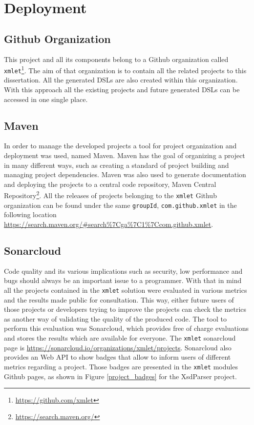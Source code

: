 \chapter{Deployment}
\label{cha:deployment}

\section{Github Organization} %
\label{sec:github}

This project and all its components belong to a Github organization called \texttt{xmlet}\footnote{\url{https://github.com/xmlet}}. The aim of that organization is to contain all the related projects to this dissertation. All the generated \ac{DSL}s are also created within this organization. With this approach all the existing projects and future generated \ac{DSL}s can be accessed in one single place.

\section{Maven} %
\label{sec:maven}

In order to manage the developed projects a tool for project organization and deployment was used, named Maven\cite{maven}. Maven has the goal of organizing a project in many different ways, such as creating a standard of project building and managing project dependencies. Maven was also used to generate documentation and deploying the projects to a central code repository, Maven Central Repository\footnote{\url{https://search.maven.org/}}. All the releases of projects belonging to the \texttt{xmlet} Github organization can be found under the same \texttt{groupId}, \texttt{com.github.xmlet} in the following location \url{https://search.maven.org/#search%7Cga%7C1%7Ccom.github.xmlet}. 

\section{Sonarcloud} %
\label{sec:sonarcloud}

Code quality and its various implications such as security, low performance and bugs should always be an important issue to a programmer. With that in mind all the projects contained in the \texttt{xmlet} solution were evaluated in various metrics and the results made public for consultation. This way, either future users of those projects or developers trying to improve the projects can check the metrics as another way of validating the quality of the produced code. The tool to perform this evaluation was Sonarcloud, which provides free of charge evaluations and stores the results which are available for everyone. The \texttt{xmlet} sonarcloud page is \url{https://sonarcloud.io/organizations/xmlet/projects}. Sonarcloud also provides an Web \ac{API} to show badges that allow to inform users of different metrics regarding a project. Those badges are presented in the \texttt{xmlet} modules Github pages, as shown in Figure \ref{project_badges} for the XsdParser project.

